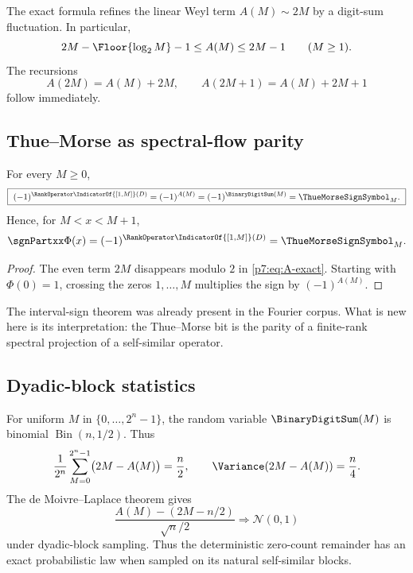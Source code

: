 \documentclass[11pt]{article}
\numberwithin{equation}{section}
\theoremstyle{definition}
\theoremstyle{remark}
\begin{document}
The exact formula refines the linear Weyl term $A(M)\sim2M$ by a digit-sum fluctuation.  In particular,
\begin{equation}\label{p7:eq:A-bounds}
 2M-\Floor{\log_2M}-1\le A(M)\le2M-1
 \qquad(M\ge1).
\end{equation}
The recursions
\begin{equation}\label{p7:eq:A-rec}
 A(2M)=A(M)+2M,
 \qquad
 A(2M+1)=A(M)+2M+1
\end{equation}
follow immediately.

\subsection{Thue--Morse as spectral-flow parity}

\begin{corollary}\label{p7:cor:spectral-parity}
For every $M\ge0$,
\begin{equation}\label{p7:eq:spectral-parity}
 \boxed{\ (-1)^{\RankOperator\IndicatorOf{[1,M]}(D)}=(-1)^{A(M)}
 =(-1)^{\BinaryDigitSum(M)}=\ThueMorseSignSymbol_M.\ }
\end{equation}
Hence, for $M<x<M+1$,
\[
 \sgnPartxx\Phi(x)=(-1)^{\RankOperator\IndicatorOf{[1,M]}(D)}=\ThueMorseSignSymbol_M.
\]
\end{corollary}

\begin{proof}
The even term $2M$ disappears modulo $2$ in \cref{p7:eq:A-exact}.  Starting with $\Phi(0)=1$, crossing the zeros $1,\ldots,M$ multiplies the sign by $(-1)^{A(M)}$.
\end{proof}

The interval-sign theorem was already present in the Fourier corpus.  What is new here is its interpretation: the Thue--Morse bit is the parity of a finite-rank spectral projection of a self-similar operator.

\subsection{Dyadic-block statistics}

For uniform $M$ in $\{0,\ldots,2^n-1\}$, the random variable $\BinaryDigitSum(M)$ is binomial $\operatorname{Bin}(n,1/2)$.  Thus
\begin{equation}\label{p7:eq:block-mean}
 \frac1{2^n}\sum_{M=0}^{2^n-1}\bigl(2M-A(M)\bigr)=\frac n2,
 \qquad
 \Variance(2M-A(M))=\frac n4.
\end{equation}
The de Moivre--Laplace theorem gives
\begin{equation}\label{p7:eq:count-clt}
 \frac{A(M)-(2M-n/2)}{\sqrt n/2}
 \Longrightarrow \mathcal N(0,1)
\end{equation}
under dyadic-block sampling.  Thus the deterministic zero-count remainder has an exact probabilistic law when sampled on its natural self-similar blocks.
\end{document}
